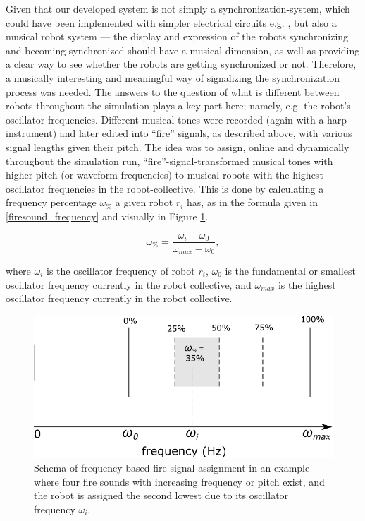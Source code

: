 			Given that our developed system is not simply a synchronization-system, which could have been implemented with simpler electrical circuits e.g. \cite{konishi_kokame}, but also a musical robot system — the display and expression of the robots synchronizing and becoming synchronized should have a musical dimension, as well as providing a clear way to see whether the robots are getting synchronized or not. Therefore, a musically interesting and meaningful way of signalizing the synchronization process was needed. The answers to the question of what is different between robots throughout the simulation plays a key part here; namely, e.g. the robot's oscillator frequencies. 
			Different musical tones were recorded (again with a harp instrument) and later edited into ``fire'' signals, as described above, with various signal lengths given their pitch.
			The idea was to assign, online and dynamically throughout the simulation run, ``fire''-signal-transformed musical tones with higher pitch (or waveform frequencies) to musical robots with the highest oscillator frequencies in the robot-collective. This is done by calculating a frequency percentage $\omega_\%$ a given robot $r_i$ has, as in the formula given in \ref{firesound_frequency} and visually in Figure \ref{fig:fire_signal_freq_assigning}.
			
			\begin{equation}\label{firesound_frequency}
				\omega_\% = \frac{\omega_i-\omega_0}{\omega_{max}-\omega_0},
			\end{equation}
	
			where $\omega_i$ is the oscillator frequency of robot $r_i$, $\omega_0$ is the fundamental or smallest oscillator frequency currently in the robot collective, and $\omega_{max}$ is the highest oscillator frequency currently in the robot collective.
			
			\begin{figure}[h]
				\centering
				\includegraphics[width=0.7\linewidth]{Assets/DocSegments/Chapters/Implementation/Figures/Illustrations/frequency_firesignal_assigning.pdf}
				\caption[Schema of frequency based fire signal assignment.]{Schema of frequency based fire signal assignment in an example where four fire sounds with increasing frequency or pitch exist, and the robot is assigned the second lowest due to its oscillator frequency $\omega_i$.}
				\label{fig:fire_signal_freq_assigning}
			\end{figure}
			

